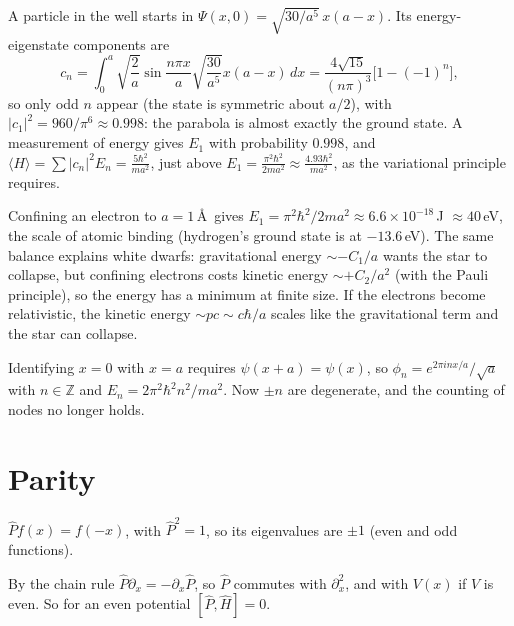 \begin{example}
A particle in the well starts in $\Psi(x,0) = \sqrt{30/a^5}\,x(a-x)$. Its energy-eigenstate components are
\[
    c_n = \int_0^a\sqrt{\frac2a}\sin\frac{n\pi x}{a}\sqrt{\frac{30}{a^5}}x(a-x)\,dx = \frac{4\sqrt{15}}{(n\pi)^3}\bigl[1-(-1)^n\bigr],
\]
so only odd $n$ appear (the state is symmetric about $a/2$), with $|c_1|^2 = 960/\pi^6\approx0.998$: the parabola is almost exactly the ground state. A measurement of energy gives $E_1$ with probability $0.998$, and $\langle H\rangle = \sum|c_n|^2E_n = \frac{5\hbar^2}{ma^2}$, just above $E_1 = \frac{\pi^2\hbar^2}{2ma^2}\approx\frac{4.93\hbar^2}{ma^2}$, as the variational principle requires.
\end{example}

\begin{example}
Confining an electron to $a = 1$\,\AA\ gives $E_1 = \pi^2\hbar^2/2ma^2\approx6.6\times10^{-18}$\,J $\approx40$\,eV, the scale of atomic binding (hydrogen's ground state is at $-13.6$\,eV). The same balance explains white dwarfs: gravitational energy $\sim-C_1/a$ wants the star to collapse, but confining electrons costs kinetic energy $\sim+C_2/a^2$ (with the Pauli principle), so the energy has a minimum at finite size. If the electrons become relativistic, the kinetic energy $\sim pc\sim c\hbar/a$ scales like the gravitational term and the star can collapse.
\end{example}

\begin{example}
Identifying $x = 0$ with $x = a$ requires $\psi(x+a) = \psi(x)$, so $\phi_n = e^{2\pi inx/a}/\sqrt{a}$ with $n\in\mathbb{Z}$ and $E_n = 2\pi^2\hbar^2n^2/ma^2$. Now $\pm n$ are degenerate, and the counting of nodes no longer holds.
\end{example}

\section{Parity}

\begin{definition}
$\hat{P}f(x) = f(-x)$, with $\hat{P}^2 = 1$, so its eigenvalues are $\pm1$ (even and odd functions).
\end{definition}

By the chain rule $\hat{P}\partial_x = -\partial_x\hat{P}$, so $\hat{P}$ commutes with $\partial_x^2$, and with $V(x)$ if $V$ is even. So for an even potential $[\hat{P},\hat{H}] = 0$.

